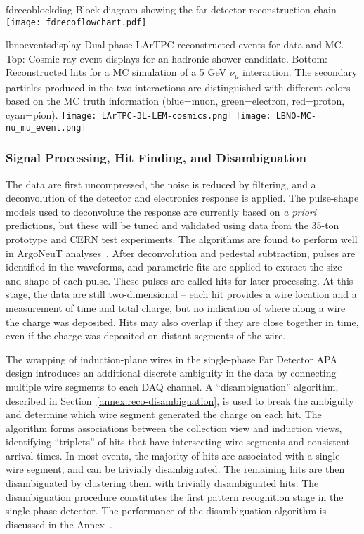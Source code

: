 \begin{cdrfigure}{fdrecoblockdiag}
{Block diagram showing the far detector reconstruction chain}
\texttt{[image: fdrecoflowchart.pdf]}
\end{cdrfigure}

\begin{cdrfigure}{lbnoeventsdisplay}
{
Dual-phase LArTPC reconstructed events for data and MC.
Top: Cosmic ray event displays for an hadronic shower candidate.
Bottom: Reconstructed hits for a MC simulation of a 5 GeV $\nu_{\mu}$ interaction.
The secondary particles produced in the two interactions are distinguished with different colors based on the MC truth information (blue=muon, green=electron, red=proton, cyan=pion).
}
\texttt{[image: LArTPC-3L-LEM-cosmics.png]}
\texttt{[image: LBNO-MC-nu\_mu\_event.png]}
\end{cdrfigure}

\subsubsection{Signal Processing, Hit Finding, and Disambiguation}

The data are first uncompressed, the noise is reduced by filtering,
and a deconvolution of the detector and electronics response is applied.
The pulse-shape models used to deconvolute the response are currently
based on {\it a priori} predictions, but these will be tuned and
validated using data from the 35-ton prototype and CERN test experiments.
The algorithms are found to perform well in ArgoNeuT analyses~\cite{Anderson:2012vc}.
After deconvolution and pedestal subtraction, pulses are identified in
the waveforms, and parametric fits are applied to extract the size and
shape of each pulse. These pulses are called hits for later processing.
At this stage, the data are still two-dimensional -- each hit provides
a wire location and a measurement of time and total charge,
but no indication of where along a wire the charge was deposited.
Hits may also overlap if they are close together in time, 
even if the charge was deposited on distant segments of the wire.

The wrapping of induction-plane wires in the single-phase Far Detector APA design
introduces an additional discrete ambiguity in the data by connecting multiple wire
segments to each DAQ channel. A ``disambiguation'' algorithm,
described in Section~\ref{annex:reco-disambiguation}, is used to break the
ambiguity and determine which wire segment generated the charge on each hit.
The algorithm forms associations between the collection view and induction views,
identifying ``triplets'' of hits that have intersecting wire segments
and consistent arrival times. In most events, the majority of hits are
associated with a single wire segment, and can be trivially disambiguated.
The remaining hits are then disambiguated by clustering them with trivially disambiguated hits.
The disambiguation procedure constitutes the first pattern recognition stage 
in the single-phase detector.  The performance of the disambiguation algorithm is
discussed in the Annex~\cite{annex:disambiguation}.

